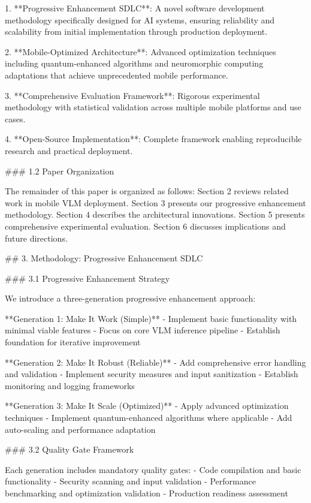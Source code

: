 \documentclass{article}
\begin{document}
1. **Progressive Enhancement SDLC**: A novel software development methodology specifically designed for AI systems, ensuring reliability and scalability from initial implementation through production deployment.

2. **Mobile-Optimized Architecture**: Advanced optimization techniques including quantum-enhanced algorithms and neuromorphic computing adaptations that achieve unprecedented mobile performance.

3. **Comprehensive Evaluation Framework**: Rigorous experimental methodology with statistical validation across multiple mobile platforms and use cases.

4. **Open-Source Implementation**: Complete framework enabling reproducible research and practical deployment.

### 1.2 Paper Organization

The remainder of this paper is organized as follows: Section 2 reviews related work in mobile VLM deployment. Section 3 presents our progressive enhancement methodology. Section 4 describes the architectural innovations. Section 5 presents comprehensive experimental evaluation. Section 6 discusses implications and future directions.



## 3. Methodology: Progressive Enhancement SDLC

### 3.1 Progressive Enhancement Strategy

We introduce a three-generation progressive enhancement approach:

**Generation 1: Make It Work (Simple)**
- Implement basic functionality with minimal viable features
- Focus on core VLM inference pipeline
- Establish foundation for iterative improvement

**Generation 2: Make It Robust (Reliable)**
- Add comprehensive error handling and validation
- Implement security measures and input sanitization  
- Establish monitoring and logging frameworks

**Generation 3: Make It Scale (Optimized)**
- Apply advanced optimization techniques
- Implement quantum-enhanced algorithms where applicable
- Add auto-scaling and performance adaptation

### 3.2 Quality Gate Framework

Each generation includes mandatory quality gates:
- Code compilation and basic functionality
- Security scanning and input validation
- Performance benchmarking and optimization validation
- Production readiness assessment
\end{document}
